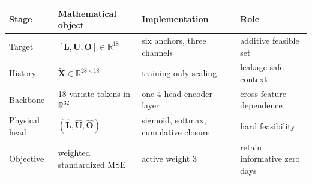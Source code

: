 \begin{tabular}{llll}
\toprule
Stage & Mathematical object & Implementation & Role \\
\midrule
Target & $[\mathbf L,\mathbf U,\mathbf O]\in\mathbb R^{18}$ & six anchors, three channels & additive feasible set \\
History & $\widetilde{\mathbf X}\in\mathbb R^{28\times18}$ & training-only scaling & leakage-safe context \\
Backbone & 18 variate tokens in $\mathbb R^{32}$ & one 4-head encoder layer & cross-feature dependence \\
Physical head & $(\widehat{\mathbf L},\widehat{\mathbf U},\widehat{\mathbf O})$ & sigmoid, softmax, cumulative closure & hard feasibility \\
Objective & weighted standardized MSE & active weight 3 & retain informative zero days \\
\bottomrule
\end{tabular}
